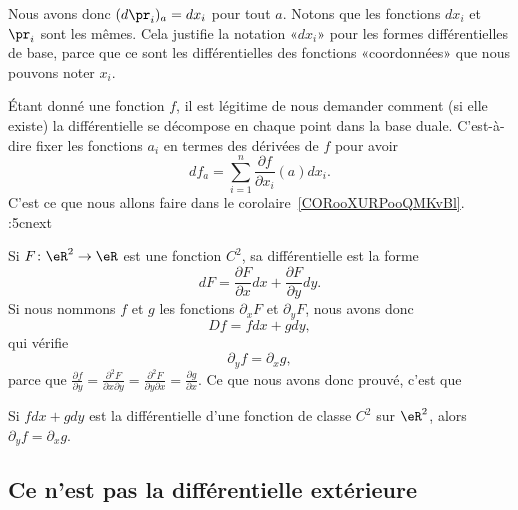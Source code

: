 Nous avons donc \( (d\pr_i)_a=dx_i\) pour tout \( a\). Notons que les fonctions \( dx_i\) et \( \pr_i\) sont les mêmes. Cela justifie la notation «\( dx_i\)» pour les formes différentielles de base, parce que ce sont les différentielles des fonctions «coordonnées» que nous pouvons noter \( x_i\).

Étant donné une fonction \( f\), il est légitime de nous demander comment (si elle existe) la différentielle se décompose en chaque point dans la base duale. C'est-à-dire fixer les fonctions \( a_i\) en termes des dérivées de \( f\) pour avoir
\begin{equation}
    df_a=\sum_{i=1}^n\frac{ \partial f }{ \partial x_i }(a)dx_i.
\end{equation}
C'est ce que nous allons faire dans le corolaire~\ref{CORooXURPooQMKvBl}.
:5cnext

\begin{example}
    Si $F\colon \eR^2\to \eR$ est une fonction $C^2$, sa différentielle est la forme
    \begin{equation}
        dF=\frac{ \partial F }{ \partial x }dx+\frac{ \partial F }{ \partial y }dy.
    \end{equation}
    Si nous nommons $f$ et $g$ les fonctions $\partial_xF$ et $\partial_yF$, nous avons donc
    \begin{equation}
        Df=fdx+gdy,
    \end{equation}
    qui vérifie
    \begin{equation}
        \partial_yf=\partial_xg,
    \end{equation}
    parce que $\frac{ \partial f }{ \partial y }=\frac{ \partial^2F  }{ \partial x\partial y }=\frac{ \partial^2F  }{ \partial y\partial x }=\frac{ \partial g }{ \partial x }$. Ce que nous avons donc prouvé, c'est que
\end{example}

\begin{lemma}
    Si $fdx+gdy$ est la différentielle d'une fonction de classe $C^2$ sur \( \eR^2\), alors $\partial_yf=\partial_xg$.
\end{lemma}

\subsection{Ce n'est pas la différentielle extérieure}

